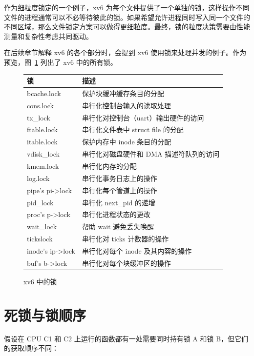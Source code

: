 作为细粒度锁定的一个例子，xv6 为每个文件提供了一个单独的锁，这样操作不同文件的进程通常可以不必等待彼此的锁。如果希望允许进程同时写入同一个文件的不同区域，那么文件锁定方案可以做得更细粒度。最终，锁的粒度决策需要由性能测量和复杂性考虑共同驱动。

在后续章节解释 xv6 的各个部分时，会提到 xv6 使用锁来处理并发的例子。作为预览，图~\ref{fig:locktable} 列出了 xv6 中的所有锁。

\begin{figure}[t]
\center
\begin{tabular}{ll}
{\bf 锁} & {\bf 描述} \\
\midrule
bcache.lock & 保护块缓冲缓存条目的分配 \\
cons.lock & 串行化控制台输入的读取处理 \\
tx\_lock & 串行化对控制台（uart）输出硬件的访问 \\
ftable.lock & 串行化文件表中 struct file 的分配 \\
itable.lock & 保护内存中 inode 条目的分配 \\
vdisk\_lock & 串行化对磁盘硬件和 DMA 描述符队列的访问 \\
kmem.lock & 串行化内存的分配 \\
log.lock & 串行化事务日志上的操作 \\
pipe's pi->lock & 串行化每个管道上的操作 \\
pid\_lock & 串行化 next\_pid 的递增 \\
proc's p->lock & 串行化进程状态的更改 \\
wait\_lock & 帮助 wait 避免丢失唤醒 \\
tickslock & 串行化对 ticks 计数器的操作 \\
inode's ip->lock & 串行化对每个 inode 及其内容的操作 \\
buf's b->lock & 串行化对每个块缓冲区的操作 \\
\end{tabular}
\caption{xv6 中的锁}
\label{fig:locktable}
\end{figure}

\newpage
\section{死锁与锁顺序}

假设在 CPU C1 和 C2 上运行的函数都有一处需要同时持有锁 A 和锁 B，但它们的获取顺序不同：

\begin{center}
  
\end{center}

